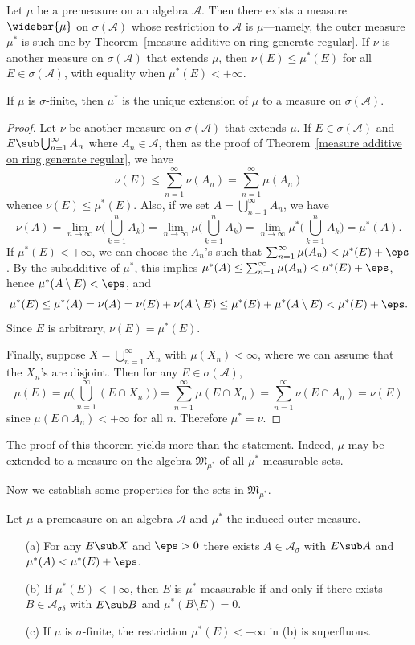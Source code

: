 \begin{theorem}\label{measrue on algebra extension}
Let $\mu$ be a premeasure on an algebra $\mathcal{A}$. Then there exists a measure $\widebar{\mu}$ on $\sigma(\mathcal{A})$ whose restriction to $\mathcal{A}$ is $\mu$---namely, the outer measure $\mu^*$ is such one by Theorem~\ref{measure additive on ring generate regular}. If $\nu$ is another measure on $\sigma(\mathcal{A})$ that extends $\mu$, then $\nu(E)\leq\mu^*(E)$ for all $E\in\sigma(\mathcal{A})$, with equality when $\mu^*(E)<+\infty$.\par
If $\mu$ is $\sigma$-finite, then $\mu^*$ is the unique extension of $\mu$ to a measure on $\sigma(\mathcal{A})$.
\end{theorem}
\begin{proof}
Let $\nu$ be another measure on $\sigma(\mathcal{A})$ that extends $\mu$. If $E\in\sigma(\mathcal{A})$ and $E\sub\bigcup_{n=1}^{\infty}A_n$ where $A_n\in\mathcal{A}$, then as the proof of Theorem~\ref{measure additive on ring generate regular}, we have
\[\nu(E)\leq\sum_{n=1}^{\infty}\nu(A_n)=\sum_{n=1}^{\infty}\mu(A_n)\] whence $\nu(E)\leq\mu^*(E)$. Also, if we set $A=\bigcup_{n=1}^{\infty}A_n$, we have
\[\nu(A)=\lim_{n\to\infty}\nu\Big(\bigcup_{k=1}^{n}A_k\Big)=\lim_{n\to\infty}\mu\Big(\bigcup_{k=1}^{n}A_k\Big)=\lim_{n\to\infty}\mu^*\Big(\bigcup_{k=1}^{n}A_k\Big)=\mu^*(A).\]
If $\mu^*(E)<+\infty$, we can choose the $A_n$'s such that $\sum_{n=1}^{\infty}\mu(A_n)<\mu^*(E)+\eps$. By the subadditive of $\mu^*$, this implies $\mu^*(A)\leq\sum_{n=1}^{\infty}\mu(A_n)<\mu^*(E)+\eps$, hence $\mu^*(A\setminus E)<\eps$, and
\[\mu^*(E)\leq\mu^*(A)=\nu(A)=\nu(E)+\nu(A\setminus E)\leq\mu^*(E)+\mu^*(A\setminus E)<\mu^*(E)+\eps.\]
Since $E$ is arbitrary, $\nu(E)=\mu^*(E)$.\par
Finally, suppose $X=\bigcup_{n=1}^{\infty}X_n$ with $\mu(X_n)<\infty$, where we can assume that the $X_n$'s are disjoint. Then for any $E\in\sigma(\mathcal{A})$,
\[\mu(E)=\mu\Big(\bigcup_{n=1}^{\infty}(E\cap X_n)\Big)=\sum_{n=1}^{\infty}\mu(E\cap X_n)=\sum_{n=1}^{\infty}\nu(E\cap A_n)=\nu(E)\]
since $\mu(E\cap A_n)<+\infty$ for all $n$. Therefore $\mu^*=\nu$.
\end{proof}
The proof of this theorem yields more than the statement. Indeed, $\mu$ may be extended to a measure on the algebra $\mathfrak{M}_{\mu^*}$ of all $\mu^*$-measurable sets.\par
Now we establish some properties for the sets in $\mathfrak{M}_{\mu^*}$.
\begin{proposition}\label{measurable outer iff sigma-delta}
Let $\mu$ a premeasure on an algebra $\mathcal{A}$ and $\mu^*$ the induced outer measure.
\begin{itemize}
\item[(a)] For any $E\sub X$ and $\eps>0$ there exists $A\in\mathcal{A}_\sigma$ with $E\sub A$ and $\mu^*(A)<\mu^*(E)+\eps$.
\item[(b)] If $\mu^*(E)<+\infty$, then $E$ is $\mu^*$-measurable if and only if there exists $B\in\mathcal{A}_{\sigma\delta}$ with $E\sub B$ and $\mu^*(B\setminus E)=0$.
\item[(c)] If $\mu$ is $\sigma$-finite, the restriction $\mu^*(E)<+\infty$ in (b) is superfluous. 
\end{itemize}
\end{proposition}

